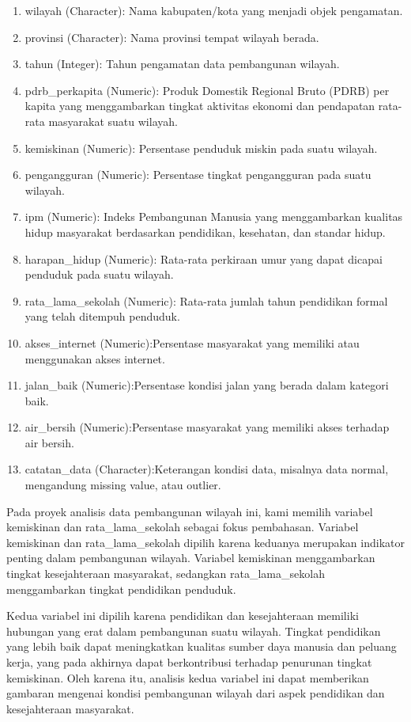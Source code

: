 \documentclass[
]{article}
\begin{document}
\begin{enumerate}
\def\labelenumi{\arabic{enumi}.}
\item
  wilayah (Character): Nama kabupaten/kota yang menjadi objek
  pengamatan.
\item
  provinsi (Character): Nama provinsi tempat wilayah berada.
\item
  tahun (Integer): Tahun pengamatan data pembangunan wilayah.
\item
  pdrb\_perkapita (Numeric): Produk Domestik Regional Bruto (PDRB) per
  kapita yang menggambarkan tingkat aktivitas ekonomi dan pendapatan
  rata-rata masyarakat suatu wilayah.
\item
  kemiskinan (Numeric): Persentase penduduk miskin pada suatu wilayah.
\item
  pengangguran (Numeric): Persentase tingkat pengangguran pada suatu
  wilayah.
\item
  ipm (Numeric): Indeks Pembangunan Manusia yang menggambarkan kualitas
  hidup masyarakat berdasarkan pendidikan, kesehatan, dan standar hidup.
\item
  harapan\_hidup (Numeric): Rata-rata perkiraan umur yang dapat dicapai
  penduduk pada suatu wilayah.
\item
  rata\_lama\_sekolah (Numeric): Rata-rata jumlah tahun pendidikan
  formal yang telah ditempuh penduduk.
\item
  akses\_internet (Numeric):Persentase masyarakat yang memiliki atau
  menggunakan akses internet.
\item
  jalan\_baik (Numeric):Persentase kondisi jalan yang berada dalam
  kategori baik.
\item
  air\_bersih (Numeric):Persentase masyarakat yang memiliki akses
  terhadap air bersih.
\item
  catatan\_data (Character):Keterangan kondisi data, misalnya data
  normal, mengandung missing value, atau outlier.
\end{enumerate}

Pada proyek analisis data pembangunan wilayah ini, kami memilih variabel
kemiskinan dan rata\_lama\_sekolah sebagai fokus pembahasan. Variabel
kemiskinan dan rata\_lama\_sekolah dipilih karena keduanya merupakan
indikator penting dalam pembangunan wilayah. Variabel kemiskinan
menggambarkan tingkat kesejahteraan masyarakat, sedangkan
rata\_lama\_sekolah menggambarkan tingkat pendidikan penduduk.

Kedua variabel ini dipilih karena pendidikan dan kesejahteraan memiliki
hubungan yang erat dalam pembangunan suatu wilayah. Tingkat pendidikan
yang lebih baik dapat meningkatkan kualitas sumber daya manusia dan
peluang kerja, yang pada akhirnya dapat berkontribusi terhadap penurunan
tingkat kemiskinan. Oleh karena itu, analisis kedua variabel ini dapat
memberikan gambaran mengenai kondisi pembangunan wilayah dari aspek
pendidikan dan kesejahteraan masyarakat.
\end{document}

